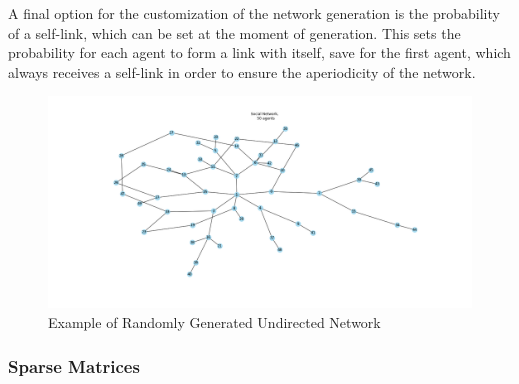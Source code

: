 \documentclass{article}
\begin{document}
A final option for the customization of the network generation is the probability of a self-link, which can be set at the moment of generation. This sets the probability for each agent to form a link with itself, save for the first agent, which always receives a self-link in order to ensure the aperiodicity of the network.
\begin{center}
    \begin{figure}[!htbp]
        \centering
        \includegraphics[width=1.1\textwidth]{ThesisKI/Images/NoneGraphRandom.png}
        \caption{Example of Randomly Generated Undirected Network}
        \label{network:random}
    \end{figure}
\end{center}

\newpage

\subsubsection{Sparse Matrices}
\end{document}
